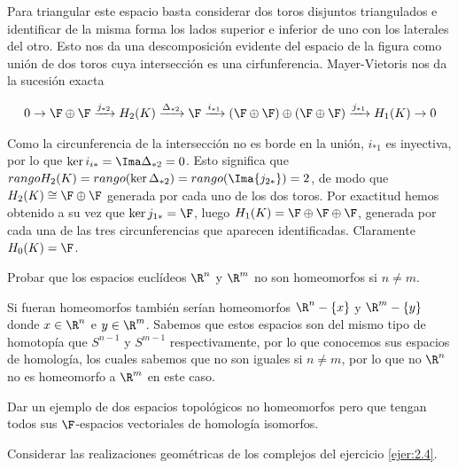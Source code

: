 \documentclass[twoside]{article}
\begin{document}
\begin{solucion}
Para triangular este espacio basta considerar dos toros disjuntos triangulados e identificar de la misma forma los lados superior e inferior de uno con los laterales del otro. Esto nos da una descomposición evidente del espacio de la figura como unión de dos toros cuya intersección es una cirfunferencia. Mayer-Vietoris nos da la sucesión exacta

\begin{align*}
0\to\F\oplus\F\xrightarrow{j_{*2}} H_2(K)\xrightarrow{\Delta_{*2}}\F\xrightarrow{i_{*1}}(\F\oplus\F)\oplus(\F\oplus\F)\xrightarrow{j_{*1}}H_1(K)\to 0
\end{align*}

Como la circunferencia de la intersección no es borde en la unión, $i_{*1}$ es inyectiva, por lo que $\ker{i_{i*}}=\Ima\Delta_{*2}=0$. Esto significa que $rango H_2(K)=rango(\ker\Delta_{*2})=rango(\Ima{j_{2*}})=2$, de modo que $H_2(K)\cong \F\oplus\F$ generada por cada uno de los dos toros. Por exactitud hemos obtenido a su vez que $\ker{j_{1*}}=\F$, luego $H_1(K)=\F\oplus\F\oplus\F$, generada por cada una de las tres circunferencias que aparecen identificadas. Claramente $H_0(K)=\F$. 
\end{solucion}

\newpage

\begin{ejercicio}{2.22}
Probar que los espacios euclídeos $\R^n$
y $\R^m$ no son homeomorfos si $n\neq m$.
\end{ejercicio}
\begin{solucion}
Si fueran homeomorfos también serían homeomorfos $\R^n-\{x\}$ y $\R^m-\{y\}$ donde $x\in\R^n$ e $y\in\R^m$. Sabemos que estos espacios son del mismo tipo de homotopía que $S^{n-1}$ y $S^{m-1}$ respectivamente, por lo que conocemos sus espacios de homología, los cuales sabemos que no son iguales si $n\neq m$, por lo que no $\R^n$ no es homeomorfo a $\R^m$ en este caso.
\end{solucion}
\newpage

\begin{ejercicio}{2.23}
Dar un ejemplo de dos espacios topológicos no homeomorfos pero que
tengan todos sus $\F$-espacios vectoriales de homología isomorfos.
\end{ejercicio}
\begin{solucion}
Considerar las realizaciones geométricas de los complejos del ejercicio \ref{ejer:2.4}.
\end{solucion}
\end{document}
